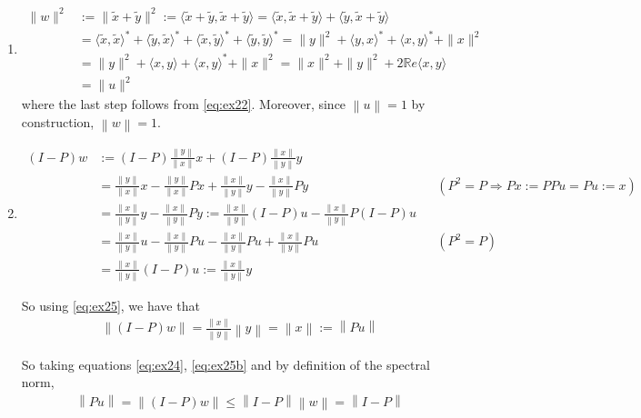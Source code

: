 \documentclass{article}
\providecommand{\norm}[1]{\ensuremath{\left\lVert#1\right\rVert}}
\begin{document}
\begin{enumerate}[label=(\roman*)]
    \item 
    \begin{align}
        \|w\|^2 &:= \|\tilde{x} + \tilde{y}\|^2 := \langle\tilde{x} + \tilde{y},\tilde{x} + \tilde{y} \rangle = \langle\tilde{x} ,\tilde{x} + \tilde{y} \rangle + \langle\tilde{y},\tilde{x} + \tilde{y} \rangle \\
        &=\langle\tilde{x} ,\tilde{x} \rangle^* + \langle \tilde{y}, \tilde{x} \rangle^* + \langle \tilde{x}, \tilde{y} \rangle^*  + \langle \tilde{y}, \tilde{y} \rangle^*  = \|y\|^2 +  \langle y,x \rangle^* + \langle x, y \rangle ^* + \|x\|^2 \\
        &= \|y\|^2 +  \langle x,y \rangle + \langle x, y \rangle ^* + \|x\|^2 = \|x\|^2 + \|y\|^2 + 2 \mathbb{R}e\langle x, y \rangle \\
        &= \|u\|^2
        \label{eq:ex24}
    \end{align}
    where the last step follows from \eqref{eq:ex22}. Moreover, since $\norm{u}=1$ by construction, $\norm{w}=1$.
    \item
    \begin{align}
        (I-P)w &:= (I-P)\frac{\norm{y}}{\norm{x}}x + (I-P)\frac{\norm{x}}{\norm{y}}y \\
        &= \frac{\norm{y}}{\norm{x}}x -
        \frac{\norm{y}}{\norm{x}}Px +\frac{\norm{x}}{\norm{y}}y-\frac{\norm{x}}{\norm{y}}Py &&(P^2 = P \Rightarrow Px := PPu=Pu:=x)\\
        &= \frac{\norm{x}}{\norm{y}}y-\frac{\norm{x}}{\norm{y}}Py := \frac{\norm{x}}{\norm{y}}(I-P)u-\frac{\norm{x}}{\norm{y}}P(I-P)u \\
        &= \frac{\norm{x}}{\norm{y}}u -\frac{\norm{x}}{\norm{y}}Pu-\frac{\norm{x}}{\norm{y}}Pu + \frac{\norm{x}}{\norm{y}}Pu &&(P^2=P) \\
        &=\frac{\norm{x}}{\norm{y}} (I-P)u := \frac{\norm{x}}{\norm{y}}y
        \label{eq:ex25}
    \end{align}
    
    So using \eqref{eq:ex25}, we have that
    \begin{align}
        \norm{(I-P)w} = \frac{\norm{x}}{\norm{y}}\norm{y} = \norm{x}:= \norm{Pu}
        \label{eq:ex25b}
    \end{align}
    
    So taking equations \eqref{eq:ex24}, \eqref{eq:ex25b} and by definition of the spectral norm,
    \begin{align}
        \norm{Pu} = \norm{(I-P)w} \leq \norm{I-P}\norm{w} = \norm{I-P}
    \end{align}
    

\end{enumerate}
\end{document}
